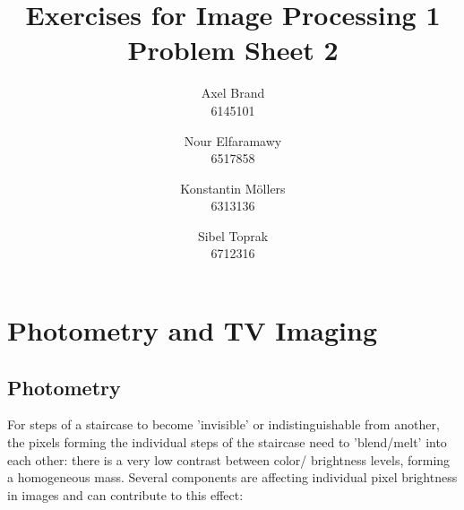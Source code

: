 \documentclass[a4paper,12pt]{article}
\title{\textbf{Exercises for Image Processing 1}\\Problem Sheet 2}
\author{Axel Brand\\6145101 \and Nour Elfaramawy\\6517858 \and Konstantin M\"ollers\\6313136 \and Sibel Toprak\\6712316}
\begin{document}
	\maketitle
	
	\section{Photometry and TV Imaging}
	
	\subsection{Photometry}
	 For steps of a staircase to become 'invisible' or indistinguishable from another, the pixels forming the individual steps of the staircase need to 'blend/melt' into each other: there is a very low contrast between color/ brightness levels, forming a homogeneous mass. Several components are affecting individual pixel brightness in images and can contribute to this effect:
	 
\end{document}
